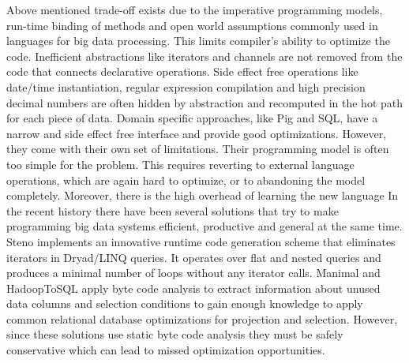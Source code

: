 Above mentioned trade-off exists due to the imperative programming models, run-time binding of methods and open world assumptions commonly used in languages for big data processing. This limits compiler's ability to optimize the code. Inefficient abstractions like iterators and channels are not removed from the code that connects declarative operations. Side effect free operations like date/time instantiation, regular expression compilation and high precision decimal numbers are often hidden by abstraction and recomputed in the hot path for each piece of data. Domain specific approaches, like Pig and SQL, have a narrow and side effect free interface and provide good optimizations. However, they come with their own set of limitations. Their programming model is often too simple for the problem. This requires reverting to external language operations, which are again hard to optimize, or to abandoning the model completely. Moreover, there is the high overhead of learning the new language 
In the recent history there have been several solutions that try to make programming big data systems efficient, productive and general at the same time. Steno \cite{murray_steno:_2011} implements an innovative runtime code generation scheme that eliminates iterators in Dryad/LINQ queries. It operates over flat and nested queries and produces a minimal number of loops without any iterator calls. Manimal \cite{jahani_automatic_2011} and HadoopToSQL \cite{iu_hadooptosql:_2010} apply byte code analysis to extract information about unused data columns and selection conditions to gain enough knowledge to apply common relational database optimizations for projection and selection. However, since these solutions use static byte code analysis they must be safely conservative which can lead to missed optimization opportunities.


